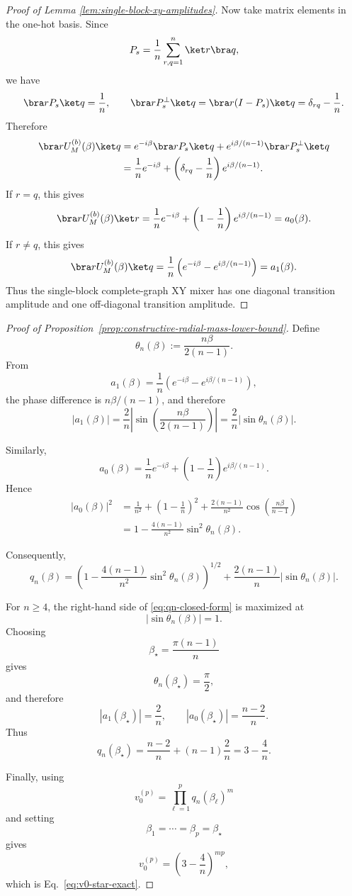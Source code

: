 \documentclass[a4paper,onecolumn,11pt,unpublished]{quantumarticle}
\theoremstyle{remark}
\begin{document}
\begin{proof}[Proof of Lemma \ref{lem:single-block-xy-amplitudes}]
Now take matrix elements in the one-hot basis. Since
\[
P_s
=
\frac{1}{n}
\sum_{r,q=1}^{n}\ket r\bra q,
\]
we have
\[
\bra r P_s\ket q=\frac{1}{n},
\qquad
\bra r P_s^\perp\ket q
=
\bra r(I-P_s)\ket q
=
\delta_{rq}-\frac{1}{n}.
\]
Therefore
\begin{align}
\label{eq:block-mixer-general-entry}
\bra r U_M^{(b)}(\beta)\ket q
&=
e^{-i\beta}\bra r P_s\ket q
+
e^{i\beta/(n-1)}
\bra r P_s^\perp\ket q
\\
&=
\frac{1}{n}e^{-i\beta}
+
\left(\delta_{rq}-\frac{1}{n}\right)e^{i\beta/(n-1)}.
\end{align}
If \(r=q\), this gives
\[
\bra r U_M^{(b)}(\beta)\ket r
=
\frac{1}{n}e^{-i\beta}
+
\left(1-\frac{1}{n}\right)e^{i\beta/(n-1)}
=
a_0(\beta).
\]
If \(r\neq q\), this gives
\[
\bra r U_M^{(b)}(\beta)\ket q
=
\frac{1}{n}
\left(
e^{-i\beta}
-
e^{i\beta/(n-1)}
\right)
=
a_1(\beta).
\]
Thus the single-block complete-graph XY mixer has  one diagonal
transition amplitude and one off-diagonal transition amplitude.
\end{proof}






\begin{proof}[Proof of Proposition~\ref{prop:constructive-radial-mass-lower-bound}]
\label{app:proof-constructive-radial-mass}
Define
\[
\theta_n(\beta):=\frac{n\beta}{2(n-1)}.
\]
From
\[
a_1(\beta)
=
\frac1n\left(e^{-i\beta}-e^{i\beta/(n-1)}\right),
\]
the phase difference is \(n\beta/(n-1)\), and therefore
\[
|a_1(\beta)|
=
\frac{2}{n}
\left|
\sin\left(\frac{n\beta}{2(n-1)}\right)
\right|
=
\frac{2}{n}|\sin\theta_n(\beta)|.
\]

Similarly,
\[
a_0(\beta)
=
\frac1n e^{-i\beta}
+
\left(1-\frac1n\right)e^{i\beta/(n-1)}.
\]
Hence
\begin{align}
|a_0(\beta)|^2
&=
\frac1{n^2}
+
\left(1-\frac1n\right)^2
+
\frac{2(n-1)}{n^2}
\cos\left(\frac{n\beta}{n-1}\right)
\nonumber\\
&=
1-\frac{4(n-1)}{n^2}\sin^2\theta_n(\beta).
\end{align}

Consequently,
\begin{equation}
\label{eq:qn-closed-form}
q_n(\beta)
=
\left(
1-\frac{4(n-1)}{n^2}\sin^2\theta_n(\beta)
\right)^{1/2}
+
\frac{2(n-1)}{n}
|\sin\theta_n(\beta)|.
\end{equation}

For \(n\ge4\), the right-hand side of
\eqref{eq:qn-closed-form} is maximized at
\[
|\sin\theta_n(\beta)|=1.
\]
Choosing
\[
\beta_\star=\frac{\pi(n-1)}{n}
\]
gives
\[
\theta_n(\beta_\star)=\frac{\pi}{2},
\]
and therefore
\[
|a_1(\beta_\star)|=\frac2n,
\qquad
|a_0(\beta_\star)|=\frac{n-2}{n}.
\]
Thus
\[
q_n(\beta_\star)
=
\frac{n-2}{n}
+
(n-1)\frac2n
=
3-\frac4n.
\]

Finally, using
\[
v_0^{(p)}
=
\prod_{\ell=1}^{p}q_n(\beta_\ell)^m
\]
and setting
\[
\beta_1=\cdots=\beta_p=\beta_\star
\]
gives
\[
v_0^{(p)}
=
\left(3-\frac4n\right)^{mp},
\]
which is Eq.~\eqref{eq:v0-star-exact}.
\end{proof}
\end{document}
